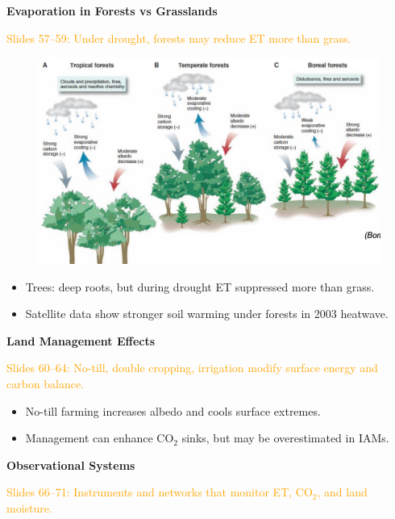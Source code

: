 \documentclass[fontsize=8pt, a4paper, landscape, fleqn]{scrartcl}
\renewcommand{\subsection}[1]{%
    \noindent\colorbox{subsectioncolor}{%
        \parbox{\dimexpr\columnwidth-2\fboxsep}{\color{white}\textbf{#1}}}%
    \vspace{0.5mm}%
}
\begin{document}
\begin{multicols*}{3}[\raggedcolumns]
\subsection{Evaporation in Forests vs Grasslands}
\noindent \textcolor{orange}{Slides 57–59: Under drought, forests may reduce ET more than grass.}
\begin{figure}[H]
    \centering
    \includegraphics[width=1\linewidth]{CS//img/Forest_difference_effect_clima.png}
\end{figure}
\begin{itemize}
    \item Trees: deep roots, but during drought ET suppressed more than grass.
    \item Satellite data show stronger soil warming under forests in 2003 heatwave.
\end{itemize}

\subsection{Land Management Effects}
\noindent \textcolor{orange}{Slides 60–64: No-till, double cropping, irrigation modify surface energy and carbon balance.}

\begin{itemize}
    \item No-till farming increases albedo and cools surface extremes.
    \item Management can enhance CO$_2$ sinks, but may be overestimated in IAMs.
\end{itemize}

\subsection{Observational Systems}
\noindent \textcolor{orange}{Slides 66–71: Instruments and networks that monitor ET, CO$_2$, and land moisture.}


\end{multicols*}
\end{document}
